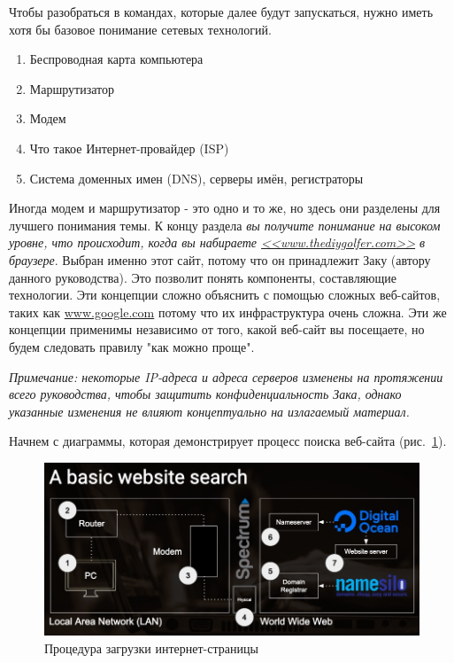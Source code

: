 \documentclass[12pt]{article}
\providecommand{\tightlist}{%
  \setlength{\itemsep}{0pt}\setlength{\parskip}{0pt}}
\begin{document}
Чтобы разобраться в командах, которые далее будут запускаться, нужно
иметь хотя бы базовое понимание сетевых технологий.

\begin{enumerate}
\tightlist
\item
  Беспроводная карта компьютера
\item
  Маршрутизатор
\item
  Модем
\item
  Что такое Интернет-провайдер (ISP)
\item
  Система доменных имен (DNS), серверы имён, регистраторы
\end{enumerate}

Иногда модем и маршрутизатор - это одно и то же, но здесь они разделены
для лучшего понимания темы. К концу раздела \emph{вы получите понимание
на высоком уровне, что происходит, когда вы набираете
\href{http://www.thediygolfer.com}{<<www.thediygolfer.com>>} в браузере}.
Выбран именно этот сайт, потому что он принадлежит Заку (автору
данного руководства). Это позволит понять компоненты, составляющие
технологии. Эти концепции сложно объяснить с помощью сложных веб-сайтов,
таких как \href{http://www.google.com}{www.google.com} потому что их
инфраструктура очень сложна. Эти же концепции применимы независимо от
того, какой веб-сайт вы посещаете, но будем следовать правилу "как можно
проще".

\emph{Примечание: некоторые IP-адреса и адреса серверов изменены на
протяжении всего руководства, чтобы защитить конфиденциальность Зака,
однако указанные изменения не влияют концептуально на излагаемый
материал.}

Начнем с диаграммы, которая демонстрирует процесс поиска веб-сайта (рис.~\ref{fig:pageloading}).

\begin{figure}[tbh]
  \centering
  \includegraphics[width=0.9\linewidth]{blog/2019/bash-essentials/basic-web-search.jpg}

  \caption{Процедура загрузки интернет-страницы}
  \label{fig:pageloading}
\end{figure}
\end{document}
